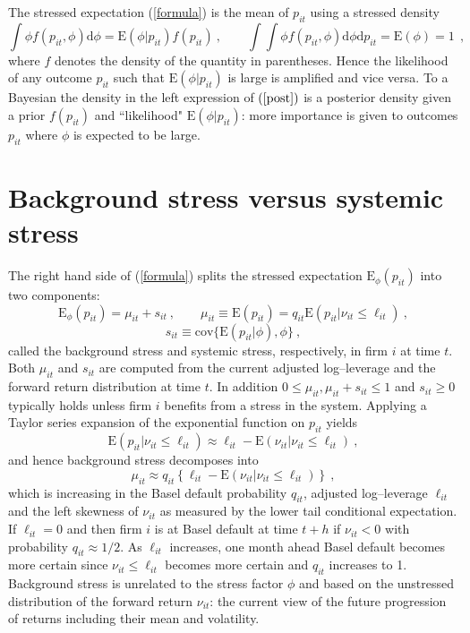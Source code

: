\documentclass[authoryear]{elsarticle}
\newcommand{\E}{\mathrm{E}}
\newcommand{\cov}{\mathrm{cov}}
\newcommand{\Es}{\E_\phi}
\newcommand{\de}{\mathrm{d}}
\newcommand{\eref}[1]{(\ref{#1})}
\newcommand{\cq}{\ , \qquad}
\newcommand{\be}[1]{\begin{equation}\label{#1}}
\newcommand{\ee}{\end{equation}}
\begin{document}
The stressed expectation \eref{formula}  is the mean of $p_{it}$  using a stressed density
\be{post}
\int \phi f(p_{it},\phi)\de \phi= \E(\phi|p_{it})f(p_{it})\cq \int\int \phi f(p_{it},\phi)\de \phi\de p_{it} = \E(\phi) = 1\
\  ,
\ee
where $f$ denotes the density of the quantity in parentheses.
Hence the likelihood of any outcome $p_{it}$ such that $\E(\phi|p_{it})$ is large is amplified and vice versa.   To a Bayesian the density in the left  expression of $\eref{post}$ is a posterior density given a prior $f(p_{it})$ and ``likelihood" $\E(\phi|p_{it})$: more importance is given to outcomes   $p_{it}$  where $\phi$ is expected to be large.



\section{Background stress versus systemic stress}


The right hand side of \eref{formula} splits the stressed expectation $\Es(p_{it})$ into two components:
\be{vsstress}
\Es(p_{it}) =\mu_{it}+s_{it}\cq
 \mu_{it} \equiv \E(p_{it})=q_{it}\E(p_{it}|\nu_{it}\le \ell_{it}) \ ,
\ee
$$
s_{it} \equiv \cov\{\E(p_{it}|\phi),\phi\}\ ,
$$
called  the background stress  and systemic stress, respectively, in firm $i$ at time $t$. Both $\mu_{it}$ and $s_{it}$ are computed from the current adjusted log--leverage and the forward return distribution at time $t$. In addition $0\le \mu_{it},\mu_{it}+s_{it}\le 1$ and $s_{it}\ge 0$ typically holds unless firm $i$ benefits from a stress in the system. Applying a Taylor series expansion of the exponential function on $p_{it}$ yields
$$
\E(p_{it}|\nu_{it}\le \ell_{it}) \approx \ell_{it}-\E(\nu_{it}|\nu_{it}\le \ell_{it})\ ,
$$
and hence background stress decomposes into
$$
\mu_{it} \approx q_{it} \left\{\ell_{it} - \E(\nu_{it}|\nu_{it}\le \ell_{it})\right\} \ ,
$$
which is increasing in the Basel default probability $q_{it}$, adjusted log--leverage $\ell_{it}$ and the left skewness of $\nu_{it}$ as measured by the lower tail conditional expectation. If $\ell_{it}=0$  and then firm $i$ is at Basel default at time $t+h$ if  $\nu_{it}<0$ with probability $q_{it}\approx 1/2$. As  $\ell_{it}$ increases,  one month ahead Basel default becomes more certain since $\nu_{it}\le \ell_{it}$ becomes more certain and $q_{it}$ increases to 1. Background stress is unrelated to the stress factor $\phi$ and based on the unstressed distribution of the forward return $\nu_{it}$: the current view of the future progression of returns including their mean and volatility.
\end{document}
